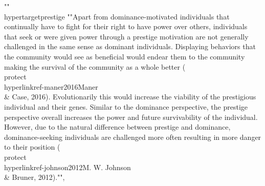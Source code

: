 {{{{{""\\hypertarget{prestige}{%
""Apart from dominance-motivated individuals that continually have to fight for their right to have power over others, individuals that seek or were given power through a prestige motivation are not generally challenged in the same sense as dominant individuals. Displaying behaviors that the community would see as beneficial would endear them to the community making the survival of the community as a whole better (\\protect\\hyperlink{ref-maner2016}{Maner \\& Case, 2016}). Evolutionarily this would increase the viability of the prestigious individual and their genes. Similar to the dominance perspective, the prestige perspective overall increases the power and future survivability of the individual. However, due to the natural difference between prestige and dominance, dominance-seeking individuals are challenged more often resulting in more danger to their position (\\protect\\hyperlink{ref-johnson2012}{M. W. Johnson \\& Bruner, 2012})."", 
}}}}}}
